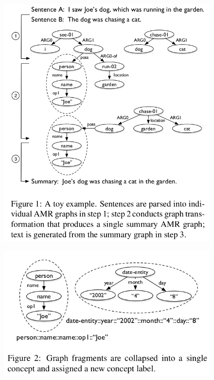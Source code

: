 \documentclass[xcolor={table}]{beamer}
\begin{document}
\begin{frame}{\cite{liu2015toward}}
\begin{figure}[h]
\centering
\includegraphics[scale=.25]{images/figure1-liu15} \\
\end{figure}
\end{frame}

\begin{frame}{\cite{liu2015toward}}
\begin{figure}[h]
\centering
\includegraphics[scale=.25]{images/figure2-liu15} \\
\end{figure}
\end{frame}
\end{document}

